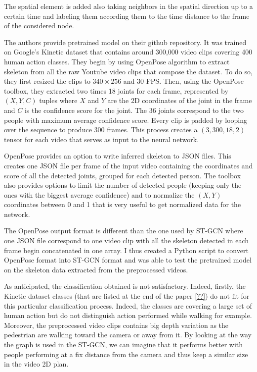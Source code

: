 \documentclass[12pt,a4paper,twoside]{article}
\begin{document}
The spatial element is added also taking neighbors in the spatial direction up to a certain time and labeling them according them to the time distance to the frame of the considered node.

The authors provide pretrained model on their github repository. It was trained on Google's Kinetic dataset that contains around 300,000 video clips covering 400 human action classes. They begin by using OpenPose algorithm to extract skeleton from all the raw Youtube video clips that compose the dataset. To do so, they first resized the clips to $340 \times 256$ and $30$ FPS. Then, using the OpenPose toolbox, they extracted two times 18 joints for each frame, represented by $(X,Y,C)$ tuples where $X$ and $Y$ are the 2D coordinates of the joint in the frame and $C$ is the confidence score for the joint. The 36 joints correspond to the two people with maximum average confidence score. Every clip is padded by looping over the sequence to produce 300 frames. This process creates a $(3, 300, 18, 2)$ tensor for each video that serves as input to the neural network. 

OpenPose provides an option to write inferred skeleton to JSON files. This creates one JSON file per frame of the input video containing the coordinates and score of all the detected joints, grouped for each detected person. The toolbox also provides options to limit the number of detected people (keeping only the ones with the biggest average confidence) and to normalize the $(X,Y)$ coordinates between 0 and 1 that is very useful to get normalized data for the network.

The OpenPose output format is different than the one used by ST-GCN where one JSON file correspond to one video clip with all the skeleton detected in each frame begin concatenated in one array. I thus created a Python script to convert OpenPose format into ST-GCN format and was able to test the pretrained model on the skeleton data extracted from the preprocessed videos.

As anticipated, the classification obtained is not satisfactory. Indeed, firstly, the Kinetic dataset classes (that are listed at the end of the paper \ref{??}) do not fit for this particular classification process. Indeed, the classes are covering a large set of human action but do not distinguish action performed while walking for example. Moreover, the preprocessed video clips contains big depth variation as the pedestrian are walking toward the camera or away from it. By looking at the way the graph is used in the ST-GCN, we can imagine that it performs better with people performing at a fix distance from the camera and thus keep a similar size in the video 2D plan. 
\end{document}
